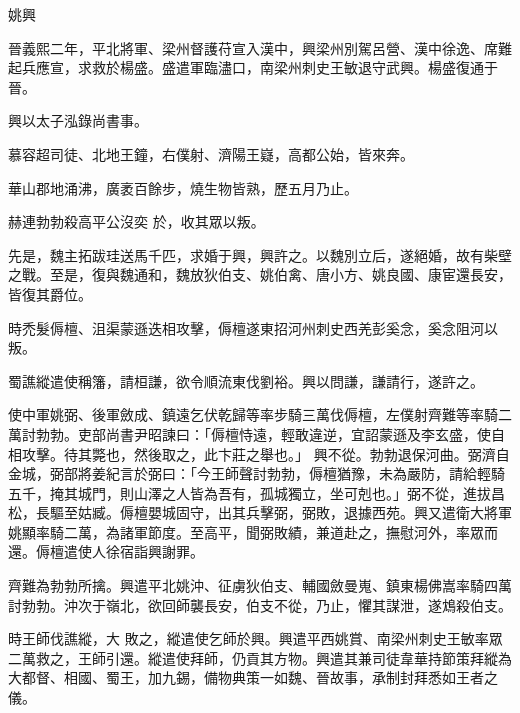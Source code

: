 
\begin{pinyinscope}
姚興



 晉義熙二年，平北將軍、梁州督護苻宣入漢中，興梁州別駕呂營、漢中徐逸、席難起兵應宣，求救於楊盛。盛遣軍臨濜口，南梁州刺史王敏退守武興。楊盛復通于晉。



 興以太子泓錄尚書事。



 慕容超司徒、北地王鐘，右僕射、濟陽王嶷，高都公始，皆來奔。



 華山郡地涌沸，廣袤百餘步，燒生物皆熟，歷五月乃止。



 赫連勃勃殺高平公沒奕
 於，收其眾以叛。



 先是，魏主拓跋珪送馬千匹，求婚于興，興許之。以魏別立后，遂絕婚，故有柴壁之戰。至是，復與魏通和，魏放狄伯支、姚伯禽、唐小方、姚良國、康宦還長安，皆復其爵位。



 時禿髮傉檀、沮渠蒙遜迭相攻擊，傉檀遂東招河州刺史西羌彭奚念，奚念阻河以叛。



 蜀譙縱遣使稱籓，請桓謙，欲令順流東伐劉裕。興以問謙，謙請行，遂許之。



 使中軍姚弼、後軍斂成、鎮遠乞伏乾歸等率步騎三萬伐傉檀，左僕射齊難等率騎二萬討勃勃。吏部尚書尹昭諫曰：「傉檀恃遠，輕敢違逆，宜詔蒙遜及李玄盛，使自相攻擊。待其斃也，然後取之，此卞莊之舉也。」
 興不從。勃勃退保河曲。弼濟自金城，弼部將姜紀言於弼曰：「今王師聲討勃勃，傉檀猶豫，未為嚴防，請給輕騎五千，掩其城門，則山澤之人皆為吾有，孤城獨立，坐可剋也。」弼不從，進拔昌松，長驅至姑臧。傉檀嬰城固守，出其兵擊弼，弼敗，退據西苑。興又遣衛大將軍姚顯率騎二萬，為諸軍節度。至高平，聞弼敗績，兼道赴之，撫慰河外，率眾而還。傉檀遣使人徐宿詣興謝罪。



 齊難為勃勃所擒。興遣平北姚沖、征虜狄伯支、輔國斂曼嵬、鎮東楊佛嵩率騎四萬討勃勃。沖次于嶺北，欲回師襲長安，伯支不從，乃止，懼其謀泄，遂鴆殺伯支。



 時王師伐譙縱，大
 敗之，縱遣使乞師於興。興遣平西姚賞、南梁州刺史王敏率眾二萬救之，王師引還。縱遣使拜師，仍貢其方物。興遣其兼司徒韋華持節策拜縱為大都督、相國、蜀王，加九錫，備物典策一如魏、晉故事，承制封拜悉如王者之儀。




\end{pinyinscope}
